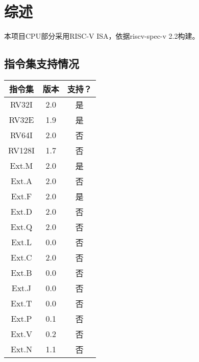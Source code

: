 %
%
%
%
%
%
%
%

\chapter{综述}
本项目CPU部分采用RISC-V ISA，依据riscv-spec-v 2.2构建。
\section{指令集支持情况}
\begin{tabular}{|c|c|c|}
    \hline
    指令集  &   版本    &   支持？\\\hline
    RV32I   &   2.0 &   是\\\hline
    RV32E   &   1.9 &   是\\\hline
    RV64I   &   2.0 &   否\\\hline
    RV128I  &   1.7 &   否\\\hline
    Ext.M   &   2.0 &   是\\\hline
    Ext.A   &   2.0 &   否\\\hline
    Ext.F   &   2.0 &   是\\\hline
    Ext.D   &   2.0 &   否\\\hline
    Ext.Q   &   2.0 &   否\\\hline
    Ext.L   &   0.0 &   否\\\hline
    Ext.C   &   2.0 &   否\\\hline
    Ext.B   &   0.0 &   否\\\hline
    Ext.J   &   0.0 &   否\\\hline
    Ext.T   &   0.0 &   否\\\hline
    Ext.P   &   0.1 &   否\\\hline
    Ext.V   &   0.2 &   否\\\hline
    Ext.N   &   1.1 &   否\\\hline
\end{tabular}
